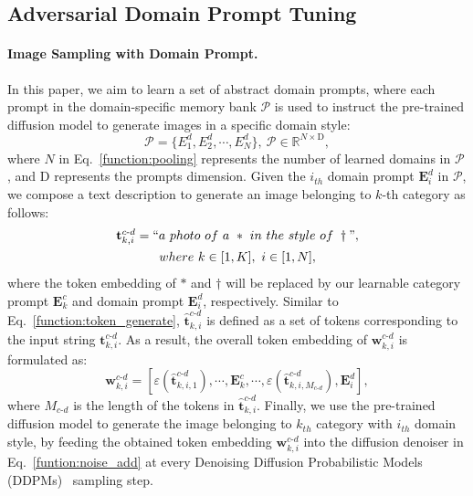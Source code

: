 \subsection{Adversarial Domain Prompt Tuning}

\paragraph{Image Sampling with Domain Prompt.}
In this paper, we aim to learn a set of abstract domain prompts, where each prompt in the domain-specific memory bank $\mathcal{P}$ is used to instruct the pre-trained diffusion model to generate images in a specific domain style:
\begin{equation}
    \mathcal{P}=\{E^d_1,E^d_2,\cdots,E^d_N\}, \ \mathcal{P} \in \mathbb{R}^{N \times \mathrm{D}},
    \label{function:pooling}
\end{equation}
where $N$ in Eq.~\textcolor{red}{\ref{function:pooling}} represents the number of learned domains in $\mathcal{P}$, and $\mathrm{D}$ represents the prompts dimension.
Given the $i_{th}$ domain prompt $\mathbf{E}_i^d$ in $\mathcal{P}$, we compose a text description to generate an image belonging to $k$-th category as follows:  
\begin{equation}
\begin{array}{cc}
    \mathbf{t}_{k,i}^{c\text{-} d}=``a \ photo \ of \ a \ \ast \ in \ the \ style \ of \ \dagger", 
    \vspace{1.5mm} \\
    where \ k \in [1,K], \ i \in [1, N],
\end{array}
\label{function:prompt_generate_domain}
\end{equation}
where the token embedding of $\ast$ and $\dagger$ will be replaced by our learnable category prompt $\mathbf{E}_k^c$ and domain prompt $\mathbf{E}_i^d$, respectively. 
Similar to Eq.~\textcolor{red}{\ref{function:token_generate}}, $\hat{\mathbf{t}}_{k,i}^{c\text{-} d}$ is defined as a set of tokens corresponding to the input string $\mathbf{t}_{k,i}^{c\text{-} d}$. As a result, the overall token embedding of $\mathbf{w}_{k,i}^{c\text{-} d}$ is formulated as:
\begin{equation}
    \mathbf{w}_{k,i}^{c\text{-} d}=[\varepsilon(\hat{\mathbf{t}}_{k,i,1}^{c\text{-} d}),\cdots,\mathbf{E}^c_k, \cdots,\varepsilon(\hat{\mathbf{t}}_{k,i,M_{c\text{-} d}}^{c\text{-} d}), \mathbf{E}_i^d],
    \label{function:token_generate_all}
\end{equation}
where $M_{c\text{-} d}$ is the length of the tokens in $\hat{\mathbf{t}}_{k,i}^{c\text{-} d}$. 
Finally, we use the pre-trained diffusion model to generate the image belonging to $k_{th}$ category with $i_{th}$ domain style, by feeding the obtained token embedding $\mathbf{w}_{k,i}^{c\text{-} d}$ into the diffusion denoiser in Eq.~\textcolor{red}{\ref{funtion:noise_add}} at every Denoising Diffusion Probabilistic Models (DDPMs)~\cite{ho2020denoising} sampling step. 

